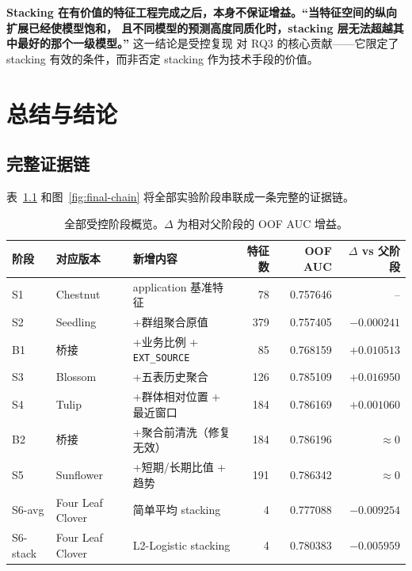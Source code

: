\documentclass[11pt,UTF8,fontset=windows]{ctexrep}
\begin{document}
\textbf{Stacking 在有价值的特征工程完成之后，本身不保证增益。“当特征空间的纵向扩展已经使模型饱和，
且不同模型的预测高度同质化时，stacking 层无法超越其中最好的那个一级模型。”} 这一结论是受控复现
对 RQ3 的核心贡献——它限定了 stacking 有效的条件，而非否定 stacking 作为技术手段的价值。

\chapter{总结与结论}
\label{chap:conclusion}

\section{完整证据链}

表~\ref{tab:full-chain} 和图~\ref{fig:final-chain} 将全部实验阶段串联成一条完整的证据链。

\begin{table}[h]
\centering
\caption{全部受控阶段概览。$\Delta$ 为相对父阶段的 OOF AUC 增益。}
\label{tab:full-chain}
\small
\setlength{\tabcolsep}{4pt}
\begin{tabular}{lllrrr}
\toprule
阶段 & 对应版本 & 新增内容 & 特征数 & OOF AUC & $\Delta$ vs 父阶段 \\
\midrule
S1   & Chestnut & application 基准特征 & 78   & 0.757646 & -- \\
S2   & Seedling & +群组聚合原值 & 379  & 0.757405 & $-0.000241$ \\
B1   & 桥接     & +业务比例 + \texttt{EXT\_SOURCE} & 85 & 0.768159 & $+0.010513$ \\
S3   & Blossom  & +五表历史聚合 & 126  & 0.785109 & $+0.016950$ \\
S4   & Tulip    & +群体相对位置 + 最近窗口 & 184 & 0.786169 & $+0.001060$ \\
B2   & 桥接     & +聚合前清洗（修复无效）& 184 & 0.786196 & $\approx 0$ \\
S5   & Sunflower& +短期/长期比值 + 趋势 & 191 & 0.786342 & $\approx 0$ \\
S6-avg   & Four Leaf Clover & 简单平均 stacking & 4 & 0.777088 & $-0.009254$ \\
S6-stack & Four Leaf Clover & L2-Logistic stacking & 4 & 0.780383 & $-0.005959$ \\
\bottomrule
\end{tabular}
\end{table}
\end{document}
